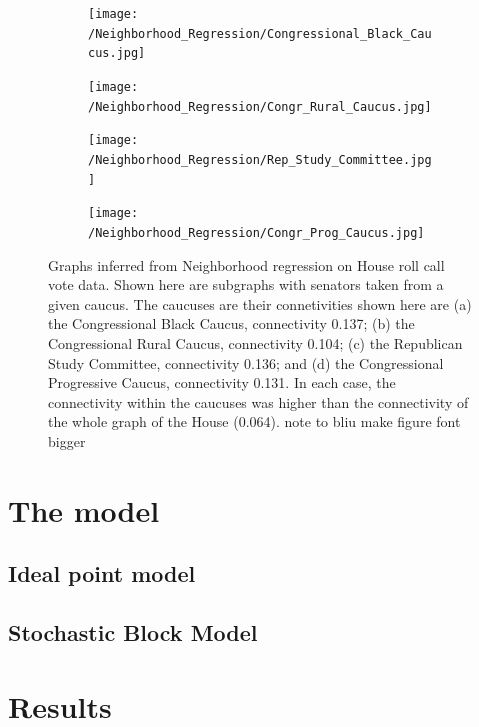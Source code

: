 \documentclass{article}
\begin{document}
\begin{figure}[h]
  \centering
    \begin{subfigure}[b]{0.49\textwidth}
        \texttt{[image: /Neighborhood\_Regression/Congressional\_Black\_Caucus.jpg]}
        \caption{}
    \end{subfigure}
          \begin{subfigure}[b]{0.49\textwidth}
        \texttt{[image: /Neighborhood\_Regression/Congr\_Rural\_Caucus.jpg]}
        \caption{}
    \end{subfigure}
        \begin{subfigure}[b]{0.49\textwidth}
        \texttt{[image: /Neighborhood\_Regression/Rep\_Study\_Committee.jpg]}
        \caption{}
    \end{subfigure}
          \begin{subfigure}[b]{0.49\textwidth}
        \texttt{[image: /Neighborhood\_Regression/Congr\_Prog\_Caucus.jpg]}
        \caption{}
    \end{subfigure}
  \caption{Graphs inferred from Neighborhood regression on House roll call vote data. Shown here are subgraphs with senators taken from a given caucus. The caucuses are their connetivities shown here are (a) the Congressional Black Caucus, connectivity 0.137; (b) the Congressional Rural Caucus, connectivity 0.104; (c) the Republican Study Committee, connectivity 0.136; and (d) the Congressional Progressive Caucus, connectivity 0.131. In each case, the connectivity within the caucuses was higher than the connectivity of the whole graph of the House (0.064). {\color{red} note to bliu make figure font bigger} }
      \label{fig:Nhood_Caucus}
\end{figure}




\section{The model}
\subsection{Ideal point model}




\subsection{Stochastic Block Model}


\section{Results}
\end{document}
